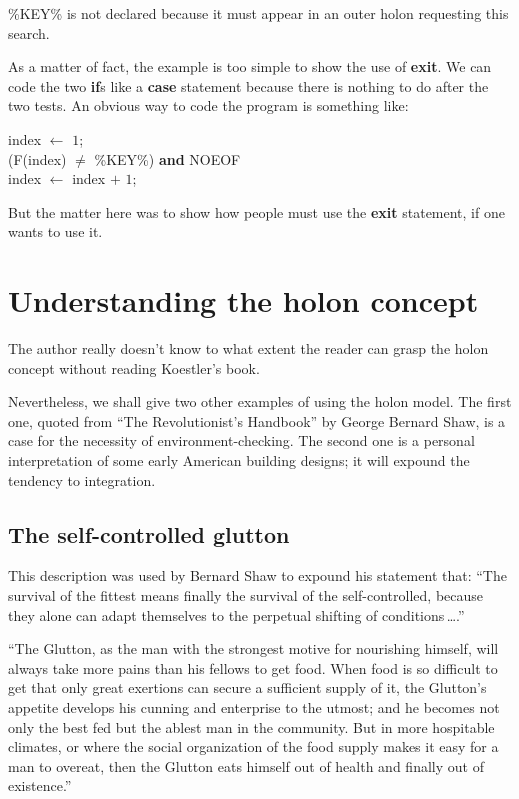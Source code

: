 \documentclass[openany,nobib]{tufte-book}
\newcommand{\kw}[1]{{\bf #1}}
\newcommand{\ind}[1]{\-\hspace{\dimexpr 2mm*#1\relax}}
\begin{document}
\smallskip\noindent
\%KEY\% is not declared because it must appear in an outer holon requesting
this search.

As a matter of fact, the example is too simple to show the use of \kw{exit}.
We can code the two \kw{if}s like a \kw{case} statement because there is
nothing to do after the two tests. An obvious way to code the program is
something like:

\medskip
\noindent
\ind{2}index $\gets$ $1$;\\
\ind{2}\kw{while} (F(index) $\neq$ \%KEY\%) \kw{and} NOEOF\\
\ind{2}\kw{do} index $\gets$ index $+$ $1$;

\medskip
\noindent
But the matter here was to show how people must use the \kw{exit} statement,
if one wants to use it.

\section{Understanding the holon concept}

The author really doesn't know to what extent the reader can grasp the holon
concept without reading Koestler's book.\autocite{koestler1968ghost}

Nevertheless, we shall give two other examples of using the holon model. The
first one, quoted from ``The Revolutionist's Handbook'' by George Bernard Shaw,
is a case for the necessity of environment-checking. The second one is a
personal interpretation of some early American building designs; it will
expound the tendency to integration.

\subsection{The self-controlled glutton}

This description was used by Bernard Shaw to expound his statement that: ``The
survival of the fittest means finally the survival of the self-controlled,
because they alone can adapt themselves to the perpetual shifting of
conditions\,\dots .''

``The Glutton, as the man with the strongest motive for nourishing himself,
will always take more pains than his fellows to get food. When food is so
difficult to get that only great exertions can secure a sufficient supply of
it, the Glutton's appetite develops his cunning and enterprise to the utmost;
and he becomes not only the best fed but the ablest man in the community. But
in more hospitable climates, or where the social organization of the food
supply makes it easy for a man to overeat, then the Glutton eats himself out of
health and finally out of existence.''\autocite{shaw1903revolutionist}
\end{document}
